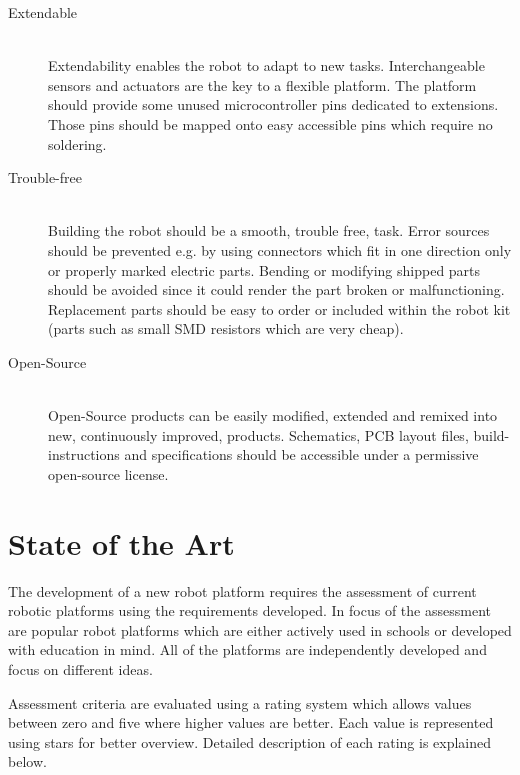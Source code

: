 \documentclass[11pt,a4paper]{article}
\begin{document}
\begin{description}
\item[Extendable] \hfill \\ Extendability enables the robot to adapt to new tasks. Interchangeable sensors and actuators are the key to a flexible platform. The platform should provide some unused microcontroller pins dedicated to extensions. Those pins should be mapped onto easy accessible pins which require no soldering.  
\item[Trouble-free] \hfill \\ Building the robot should be a smooth, trouble free, task. Error sources should be prevented e.g. by using connectors which fit in one direction only or properly marked electric parts. Bending or modifying shipped parts should be avoided since it  could render the part broken or malfunctioning. Replacement parts should be easy to order or included within the robot kit (parts such as small SMD resistors which are very cheap).
\item[Open-Source] \hfill \\ Open-Source products can be easily modified, extended and remixed into new, continuously improved, products. Schematics, PCB layout files, build-instructions and specifications should be accessible under a permissive open-source license. 
\end{description}


\section{State of the Art}
The development of a new robot platform requires the assessment of current robotic platforms using the requirements developed. In focus of the assessment are popular robot platforms which are either actively used in schools or developed with education in mind. All of the platforms are independently developed and focus on different ideas. 

Assessment criteria are evaluated using a rating system which allows values between zero and five where higher values are better. Each value is represented using stars for better overview. Detailed description of each rating is explained below.
\end{document}
